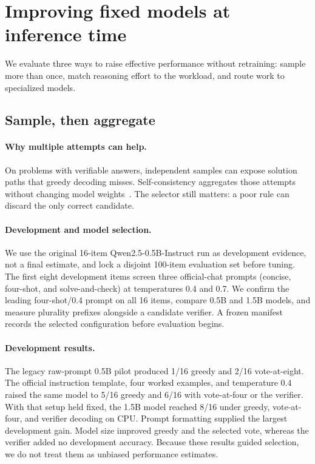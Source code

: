 \section{Improving fixed models at inference time}\label{sec:improvements}

We evaluate three ways to raise effective performance without retraining:
sample more than once, match reasoning effort to the workload, and route work
to specialized models.

\subsection{Sample, then aggregate}\label{sec:selfcons}

\paragraph{Why multiple attempts can help.} On problems with verifiable
answers, independent samples can expose solution paths that greedy decoding
misses. Self-consistency aggregates those attempts without changing model
weights~\cite{wang2022selfconsistency}. The selector still matters: a poor
rule can discard the only correct candidate.

\paragraph{Development and model selection.} We use the original 16-item
Qwen2.5-0.5B-Instruct run as development evidence, not a final estimate, and
lock a disjoint 100-item evaluation set before tuning. The first eight
development items screen three official-chat prompts (concise, four-shot, and
solve-and-check) at temperatures 0.4 and 0.7. We confirm the leading
four-shot/0.4 prompt on all 16 items, compare 0.5B and 1.5B models, and measure
plurality prefixes alongside a candidate verifier. A frozen manifest records
the selected configuration before evaluation begins.

\paragraph{Development results.} The legacy raw-prompt 0.5B pilot produced
1/16 greedy and 2/16 vote-at-eight. The official instruction template, four
worked examples, and temperature 0.4 raised the same model to 5/16 greedy and
6/16 with vote-at-four or the verifier. With that setup held fixed, the 1.5B
model reached 8/16 under greedy, vote-at-four, and verifier decoding on CPU.
Prompt formatting supplied the largest development gain. Model size improved
greedy and the selected vote, whereas the verifier added no development
accuracy. Because these results guided selection, we do not treat them as
unbiased performance estimates.

